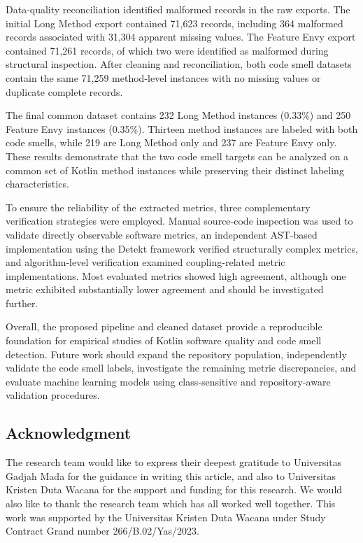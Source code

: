 \documentclass[]{einformatica}
\begin{document}
Data-quality reconciliation identified malformed records in the raw exports. The initial Long Method export contained 71,623 records, including 364 malformed records associated with 31,304 apparent missing values. The Feature Envy export contained 71,261 records, of which two were identified as malformed during structural inspection. After cleaning and reconciliation, both code smell datasets contain the same 71,259 method-level instances with no missing values or duplicate complete records.

The final common dataset contains 232 Long Method instances (0.33\%) and 250 Feature Envy instances (0.35\%). Thirteen method instances are labeled with both code smells, while 219 are Long Method only and 237 are Feature Envy only. These results demonstrate that the two code smell targets can be analyzed on a common set of Kotlin method instances while preserving their distinct labeling characteristics.

To ensure the reliability of the extracted metrics, three complementary verification strategies were employed. Manual source-code inspection was used to validate directly observable software metrics, an independent AST-based implementation using the Detekt framework verified structurally complex metrics, and algorithm-level verification examined coupling-related metric implementations. Most evaluated metrics showed high agreement, although one metric exhibited substantially lower agreement and should be investigated further.

Overall, the proposed pipeline and cleaned dataset provide a reproducible foundation for empirical studies of Kotlin software quality and code smell detection. Future work should expand the repository population, independently validate the code smell labels, investigate the remaining metric discrepancies, and evaluate machine learning models using class-sensitive and repository-aware validation procedures.

\subsection*{Acknowledgment}

The research team would like to express their deepest gratitude to Universitas Gadjah Mada for the guidance in writing this article, and also to Universitas Kristen Duta Wacana for the support and funding for this research. We would also like to thank the research team which has all worked well together. This work was supported by the Universitas Kristen Duta Wacana under Study Contract Grand number 266/B.02/Yas/2023.
\end{document}
